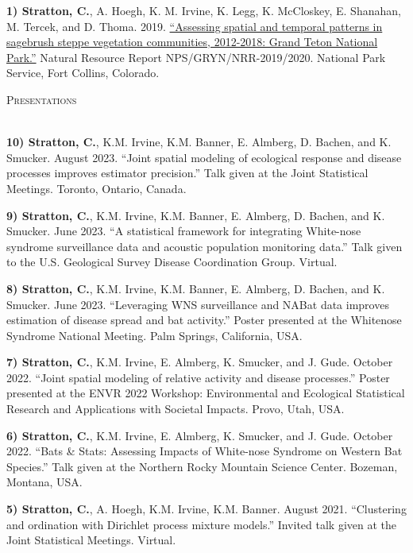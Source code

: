 \documentclass[a4paper]{article}
\newcommand{\lineunder} {
	\vspace*{-8pt} \\
	\hspace*{-18pt} \hrulefill \\
}
\newcommand{\header} [1] {
	{\hspace*{-18pt}\vspace*{6pt} \textsc{#1}}
	\vspace*{-6pt} \lineunder
}
\begin{document}
\textbf{1) Stratton, C.}, A. Hoegh, K. M. Irvine, K. Legg, K. McCloskey,
E. Shanahan, M. Tercek, and D. Thoma. 2019.
\href{https://irma.nps.gov/DataStore/DownloadFile/631136}{``Assessing
spatial and temporal patterns in sagebrush steppe vegetation
communities, 2012-2018: Grand Teton National Park.''} Natural Resource
Report NPS/GRYN/NRR-2019/2020. National Park Service, Fort Collins,
Colorado. \vspace*{2mm}

\header{Presentations}
\vspace*{2mm}

\textbf{10) Stratton, C.}, K.M. Irvine, K.M. Banner, E. Almberg, D.
Bachen, and K. Smucker. August 2023. ``Joint spatial modeling of
ecological response and disease processes improves estimator
precision.'' Talk given at the Joint Statistical Meetings. Toronto,
Ontario, Canada. \vspace*{2mm}

\textbf{9) Stratton, C.}, K.M. Irvine, K.M. Banner, E. Almberg, D.
Bachen, and K. Smucker. June 2023. ``A statistical framework for
integrating White-nose syndrome surveillance data and acoustic
population monitoring data.'' Talk given to the U.S. Geological Survey
Disease Coordination Group. Virtual. \vspace*{2mm}

\textbf{8) Stratton, C.}, K.M. Irvine, K.M. Banner, E. Almberg, D.
Bachen, and K. Smucker. June 2023. ``Leveraging WNS surveillance and
NABat data improves estimation of disease spread and bat activity.''
Poster presented at the Whitenose Syndrome National Meeting. Palm
Springs, California, USA. \vspace*{2mm}

\textbf{7) Stratton, C.}, K.M. Irvine, E. Almberg, K. Smucker, and J.
Gude. October 2022. ``Joint spatial modeling of relative activity and
disease processes.'' Poster presented at the ENVR 2022 Workshop:
Environmental and Ecological Statistical Research and Applications with
Societal Impacts. Provo, Utah, USA. \vspace*{2mm}

\textbf{6) Stratton, C.}, K.M. Irvine, E. Almberg, K. Smucker, and J.
Gude. October 2022. ``Bats \& Stats: Assessing Impacts of White-nose
Syndrome on Western Bat Species.'' Talk given at the Northern Rocky
Mountain Science Center. Bozeman, Montana, USA. \vspace*{2mm}

\textbf{5) Stratton, C.}, A. Hoegh, K.M. Irvine, K.M. Banner. August
2021. ``Clustering and ordination with Dirichlet process mixture
models.'' Invited talk given at the Joint Statistical Meetings. Virtual.
\vspace*{2mm}
\end{document}
